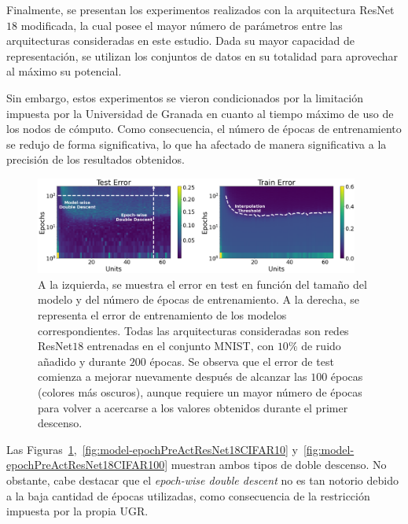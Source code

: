 Finalmente, se presentan los experimentos realizados con la arquitectura ResNet$18$ modificada, la cual posee el mayor número de parámetros entre las arquitecturas consideradas en este estudio. Dada su mayor capacidad de representación, se utilizan los conjuntos de datos en su totalidad para aprovechar al máximo su potencial.

Sin embargo, estos experimentos se vieron condicionados por la limitación impuesta por la Universidad de Granada en cuanto al tiempo máximo de uso de los nodos de cómputo. Como consecuencia, el número de épocas de entrenamiento se redujo de forma significativa, lo que ha afectado de manera significativa a la precisión de los resultados obtenidos.

\begin{figure}[h]
    \centering
    \includegraphics[width=0.95\textwidth]{img/experiments/model-epochPreActResNet18MNIST.png}
    \caption[Doble descenso en función del tamaño del modelo y del número de épocas para la red ResNet$18$ y el conjunto MNIST.]{A la izquierda, se muestra el error en test en función del tamaño del modelo y del número de épocas de entrenamiento. A la derecha, se representa el error de entrenamiento de los modelos correspondientes. Todas las arquitecturas consideradas son redes ResNet$18$ entrenadas en el conjunto MNIST, con $10\%$ de ruido añadido y durante $200$ épocas. Se observa que el error de test comienza a mejorar nuevamente después de alcanzar las $100$ épocas (colores más oscuros), aunque requiere un mayor número de épocas para volver a acercarse a los valores obtenidos durante el primer descenso.}\label{fig:model-epochPreActResNet18MNIST}
\end{figure}

Las Figuras~\ref{fig:model-epochPreActResNet18MNIST},~\ref{fig:model-epochPreActResNet18CIFAR10} y~\ref{fig:model-epochPreActResNet18CIFAR100} muestran ambos tipos de doble descenso. No obstante, cabe destacar que el \textit{epoch-wise double descent} no es tan notorio debido a la baja cantidad de épocas utilizadas, como consecuencia de la restricción impuesta por la propia UGR.

